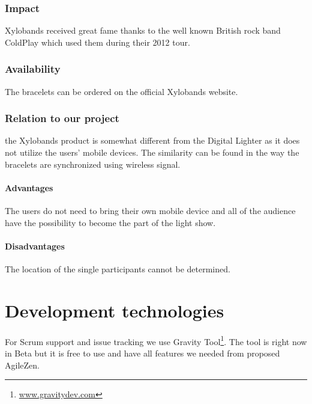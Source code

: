 \subsubsection{Impact}
Xylobands received great fame thanks to the well known British rock band ColdPlay which used them during their 2012 tour.

\subsubsection{Availability}
The bracelets can be ordered on the official Xylobands website.

\subsubsection{Relation to our project}
the Xylobands product is somewhat different from the Digital Lighter as it does not utilize the users' mobile devices. 
The similarity can be found in the way the bracelets are synchronized using wireless signal. 

\paragraph{Advantages}
The users do not need to bring their own mobile device and all of the audience have the possibility to become the part of the light show.

\paragraph{Disadvantages}
The location of the single participants cannot be determined.


\section{Development technologies}

For Scrum support and issue tracking we use Gravity Tool\footnote{\url{www.gravitydev.com}}. 
The tool is right now in Beta but it is free to use and have all features we needed from proposed AgileZen.

